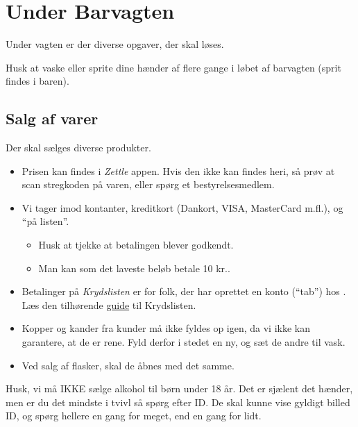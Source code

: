 \section{Under Barvagten}
\label{sec:intra-barvagten}

Under vagten er der diverse opgaver, der skal løses.

Husk at vaske eller sprite dine hænder af flere gange i løbet af barvagten
(sprit findes i baren).

\subsection{Salg af varer}
\label{sec:intra:salg}

Der skal sælges diverse produkter.
\begin{itemize}
    \item Prisen kan findes i \textit{Zettle} appen. Hvis den ikke kan findes heri, 
    så prøv at scan stregkoden på varen, eller spørg et bestyrelsesmedlem.
    \item Vi tager imod kontanter, kreditkort (Dankort, VISA, MasterCard
    m.fl.), og ``på listen''.
    \begin{itemize}
        \item Husk at tjekke at betalingen blever godkendt.
        \item Man kan som det laveste beløb betale 10 kr..
    \end{itemize}
    \item Betalinger på \textit{Krydslisten} er for folk, der har oprettet en konto
    (``tab'') hos \fredagscafeen. Læs den tilhørende \href{https://media.fredagscafeen.dk/guides/krydsliste.pdf}{guide} til Krydslisten.
    \item Kopper og kander fra kunder må ikke fyldes op igen, da vi ikke kan garantere, at de er rene. 
    Fyld derfor i stedet en ny, og sæt de andre til vask.
    \item Ved salg af flasker, skal de åbnes med det samme.
\end{itemize}

Husk, vi må IKKE sælge alkohol til børn under 18 år. 
Det er sjælent det hænder, men er du det mindste i tvivl så spørg efter ID.
De skal kunne vise gyldigt billed ID, og spørg hellere en gang for meget, end en gang for lidt.

